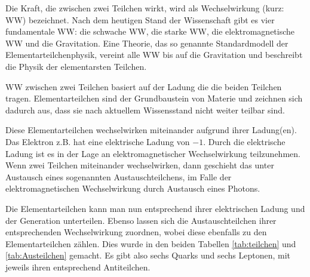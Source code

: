 Die Kraft, die zwischen zwei Teilchen wirkt, wird als Wechselwirkung (kurz: WW) bezeichnet. Nach dem heutigen Stand der Wissenschaft gibt es vier fundamentale WW: die schwache WW, die starke WW, die elektromagnetische WW und die Gravitation. Eine Theorie, das so genannte Standardmodell der Elementarteilchenphysik, vereint alle WW bis auf die Gravitation und beschreibt die Physik der elementarsten Teilchen.

WW zwischen zwei Teilchen basiert auf der Ladung die die beiden Teilchen tragen. 
Elementarteilchen sind der Grundbaustein von Materie und zeichnen sich dadurch aus, dass sie nach aktuellem Wissensstand nicht weiter teilbar sind.

Diese Elementarteilchen wechselwirken miteinander aufgrund ihrer Ladung(en). Das Elektron z.B. hat eine elektrische Ladung von $-1$. Durch die elektrische Ladung ist es in der Lage an elektromagnetischer Wechselwirkung teilzunehmen. Wenn zwei Teilchen miteinander wechselwirken, dann geschieht das unter Austausch eines sogenannten Austauschteilchens, im Falle der elektromagnetischen Wechselwirkung durch Austausch eines Photons.

Die Elementarteilchen kann man nun entsprechend ihrer elektrischen Ladung und der Generation unterteilen. Ebenso lassen sich die Austauschteilchen ihrer entsprechenden Wechselwirkung zuordnen, wobei diese ebenfalls zu den Elementarteilchen z{\"a}hlen. Dies wurde in den beiden Tabellen \ref{tab:teilchen} und \ref{tab:Austeilchen} gemacht. Es gibt also sechs Quarks und sechs Leptonen, mit jeweils ihren entsprechend Antiteilchen.

